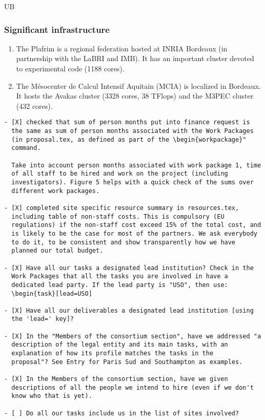 \begin{sitedescription}{UB}
\subsubsection*{Significant infrastructure}
\begin{enumerate}
\item The Plafrim is a regional federation hosted at INRIA Bordeaux (in partnership with the LaBRI and IMB). It has an important cluster devoted to experimental code (1188 cores).
\item The M\'esocenter de Calcul Intensif Aquitain (MCIA) is localized
in Bordeaux. It hosts the Avakas cluster (3328 cores,  38 TFlops) and the
M3PEC cluster (432 cores).
\end{enumerate}

\end{sitedescription}


\begin{draft}
\vspace{1cm}

\begin{verbatim}
- [X] checked that sum of person months put into finance request is
  the same as sum of person months associated with the Work Packages
  (in proposal.tex, as defined as part of the \begin{workpackage}"
  command.
  
  Take into account person months associated with work package 1, time
  of all staff to be hired and work on the project (including
  investigators). Figure 5 helps with a quick check of the sums over
  different work packages.

- [X] completed site specific resource summary in resources.tex,
  including table of non-staff costs. This is compulsory (EU
  regulations) if the non-staff cost exceed 15% of the total cost, and
  is likely to be the case for most of the partners. We ask everybody
  to do it, to be consistent and show transparently how we have
  planned our total budget.

- [X] Have all our tasks a designated lead institution? Check in the
  Work Packages that all the tasks you are involved in have a
  dedicated lead party. If the lead party is "USO", then use:
  \begin{task}[lead=USO]

- [X] Have all our deliverables a designated lead institution [using
  the 'lead=' key]?

- [X] In the "Members of the consortium section", have we addressed "a
  description of the legal entity and its main tasks, with an
  explanation of how its profile matches the tasks in the
  proposal"? See Entry for Paris Sud and Southampton as examples.

- [X] In the Members of the consortium section, have we given
  descriptions of all the people we intend to hire (even if we don't
  know who that is yet). 
  
- [ ] Do all our tasks include us in the list of sites involved?
\end{verbatim}
\end{draft}

